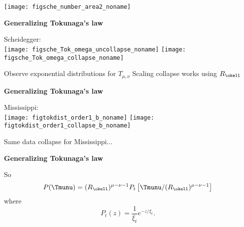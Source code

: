 \begin{frame}[label=]
\begin{frame}[label=]
\begin{frame}[label=]
\begin{frame}[label=]
\begin{frame}[label=]
\begin{frame}[label=]
\begin{frame}[label=]
\begin{frame}[label=]
\begin{frame}[label=]
\begin{frame}[label=]
\begin{frame}[label=]
\begin{frame}[label=]
\begin{frame}[label=]
\begin{frame}[label=]
\begin{frame}[label=]
\begin{frame}[label=]
\begin{frame}[label=]
\begin{frame}[label=]
\begin{frame}[label=]
\begin{frame}[label=]
\begin{frame}[label=]
\begin{frame}[label=]
\begin{frame}[label=]
\begin{frame}[label=]
\begin{frame}[label=]
\begin{frame}[label=]
\begin{frame}[label=]
\begin{frame}[label=]
\begin{frame}[label=]
\begin{frame}[label=]
\begin{frame}[label=]
\begin{frame}[label=]
\begin{frame}[label=]
\begin{frame}[label=]
\begin{frame}[label=]
\begin{frame}[label=]
\begin{frame}[label=]
\begin{frame}[label=]
\begin{frame}[label=]
\begin{frame}[label=]
\begin{frame}[label=]
\begin{frame}[label=]
\begin{frame}[label=]
\begin{frame}[label=]
\begin{frame}[label=]
\begin{frame}[label=]
\begin{frame}[label=]
\begin{frame}[label=]
\begin{frame}[label=]
    
    \texttt{[image: figsche\_number\_area2\_noname]}
  



\begin{frame}[label=]
  \textbf{Generalizing Tokunaga's law}
  
  Scheidegger:\\
  \texttt{[image: figsche\_Tok\_omega\_uncollapse\_noname]}
  \texttt{[image: figsche\_Tok\_omega\_collapse\_noname]} 

  
   Observe exponential distributions for $T_{\mu,\nu}$
   Scaling collapse works using $R_\okell$
  


\begin{frame}[label=]
  \textbf{Generalizing Tokunaga's law}
  
  Mississippi:\\
  \texttt{[image: figtokdist\_order1\_b\_noname]} 
  \texttt{[image: figtokdist\_order1\_collapse\_b\_noname]}

  
   Same data collapse for Mississippi...
  


\begin{frame}[label=]
  \textbf{Generalizing Tokunaga's law}

  So
  \[
  P(\Tmunu) = (R_\okell)^{\mu-\nu-1}
  P_t\left[ \Tmunu / (R_\okell)^{\mu-\nu-1}  \right]
  \]
  where
  \[
  P_t(z) = \frac{1}{\xi_t} e^{-z/\xi_t}.
  \]


\end{frame}
\end{frame}
\end{frame}
\end{frame}
\end{frame}
\end{frame}
\end{frame}
\end{frame}
\end{frame}
\end{frame}
\end{frame}
\end{frame}
\end{frame}
\end{frame}
\end{frame}
\end{frame}
\end{frame}
\end{frame}
\end{frame}
\end{frame}
\end{frame}
\end{frame}
\end{frame}
\end{frame}
\end{frame}
\end{frame}
\end{frame}
\end{frame}
\end{frame}
\end{frame}
\end{frame}
\end{frame}
\end{frame}
\end{frame}
\end{frame}
\end{frame}
\end{frame}
\end{frame}
\end{frame}
\end{frame}
\end{frame}
\end{frame}
\end{frame}
\end{frame}
\end{frame}
\end{frame}
\end{frame}
\end{frame}
\end{frame}
\end{frame}
\end{frame}
\end{frame}
